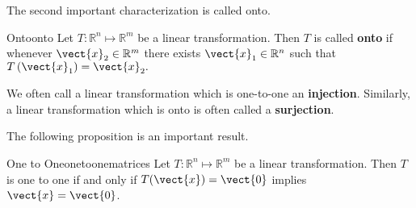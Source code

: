 The second important characterization is called onto.

\begin{definition}{Onto}{onto}
Let $T: \mathbb{R}^n \mapsto \mathbb{R}^m$ be a linear transformation. Then $T$ is called \textbf{onto} if whenever $\vect{x}_2 \in \mathbb{R}^{m}$ there exists 
$\vect{x}_1 \in \mathbb{R}^{n}$ such that $T\left( \vect{x}_1\right) = \vect{x}_2. $
\end{definition}

We often call a linear transformation which is one-to-one an \textbf{injection}. Similarly, a linear transformation which is onto is often called a \textbf{surjection}.

The following proposition is an important result. 

\begin{proposition}{One to One}{onetoonematrices}
Let $T:\mathbb{R}^n \mapsto \mathbb{R}^m$ be a linear transformation. Then $T$ is one to one if
and only if $T(\vect{x}) = \vect{0}$ implies $\vect{x}=\vect{0}$.
\end{proposition}

